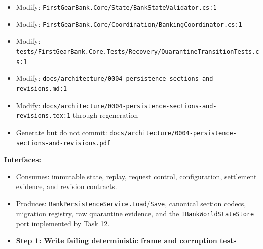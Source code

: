 \documentclass[
  10pt,
  letterpaper,
]{article}
\newcommand{\passthrough}[1]{#1}
\providecommand{\tightlist}{%
  \setlength{\itemsep}{0pt}\setlength{\parskip}{0pt}}
\begin{document}
\begin{itemize}
\item
  Modify:
  \texttt{FirstGearBank.}\allowbreak{}\texttt{Core/}\allowbreak{}\texttt{State/}\allowbreak{}\texttt{BankStateValidator.}\allowbreak{}\texttt{cs:}\allowbreak{}\texttt{1}
\item
  Modify:
  \texttt{FirstGearBank.}\allowbreak{}\texttt{Core/}\allowbreak{}\texttt{Coordination/}\allowbreak{}\texttt{BankingCoordinator.}\allowbreak{}\texttt{cs:}\allowbreak{}\texttt{1}
\item
  Modify:
  \texttt{tests/}\allowbreak{}\texttt{FirstGearBank.}\allowbreak{}\texttt{Core.}\allowbreak{}\texttt{Tests/}\allowbreak{}\texttt{Recovery/}\allowbreak{}\texttt{QuarantineTransitionTests.}\allowbreak{}\texttt{cs:}\allowbreak{}\texttt{1}
\item
  Modify:
  \texttt{docs/}\allowbreak{}\texttt{architecture/}\allowbreak{}\texttt{0004-}\allowbreak{}\texttt{persistence-}\allowbreak{}\texttt{sections-}\allowbreak{}\texttt{and-}\allowbreak{}\texttt{revisions.}\allowbreak{}\texttt{md:}\allowbreak{}\texttt{1}
\item
  Modify:
  \texttt{docs/}\allowbreak{}\texttt{architecture/}\allowbreak{}\texttt{0004-}\allowbreak{}\texttt{persistence-}\allowbreak{}\texttt{sections-}\allowbreak{}\texttt{and-}\allowbreak{}\texttt{revisions.}\allowbreak{}\texttt{tex:}\allowbreak{}\texttt{1}
  through regeneration
\item
  Generate but do not commit:
  \texttt{docs/}\allowbreak{}\texttt{architecture/}\allowbreak{}\texttt{0004-}\allowbreak{}\texttt{persistence-}\allowbreak{}\texttt{sections-}\allowbreak{}\texttt{and-}\allowbreak{}\texttt{revisions.}\allowbreak{}\texttt{pdf}
\end{itemize}

\textbf{Interfaces:}

\begin{itemize}
\tightlist
\item
  Consumes: immutable state, replay, request control, configuration,
  settlement evidence, and revision contracts.
\item
  Produces:
  \texttt{BankPersistenceService.}\allowbreak{}\texttt{Load}/\passthrough{\lstinline!Save!},
  canonical section codecs, migration registry, raw quarantine evidence,
  and the \passthrough{\lstinline!IBankWorldStateStore!} port
  implemented by Task 12.
\end{itemize}

\begin{itemize}
\tightlist
\item[$\square$]
  \textbf{Step 1: Write failing deterministic frame and corruption
  tests}
\end{itemize}
\end{document}
